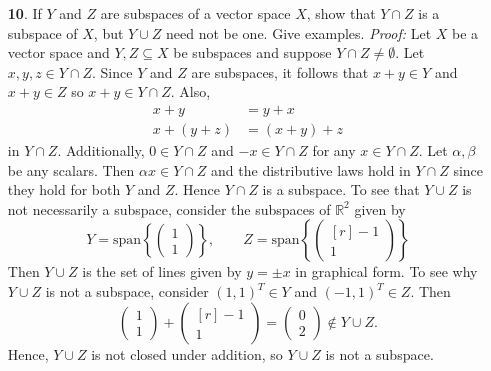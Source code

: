 \documentclass{article}
\begin{document}
\begin{itemize}
    \item[\textbf{10}.] If $Y$ and $Z$ are subspaces of a vector space $X$, show that $Y \cap Z$ is a subspace of $X$, but $Y \cup Z$ need not be one. Give examples.
    \newline\newline
    \textit{Proof:} Let $X$ be a vector space and $Y,Z \subseteq X$ be subspaces and suppose $Y\cap Z \neq \emptyset$. Let $x,y,z \in Y\cap Z$. Since $Y$ and $Z$ are subspaces, it follows that $x + y \in Y$ and $x + y \in Z$ so $x + y \in Y \cap Z$. Also,
    \begin{align*}
        x + y &= y + x\\
        x + (y + z) &= (x + y) + z
    \end{align*}
    in $Y \cap Z$. Additionally, $0 \in Y \cap Z$ and $-x \in Y \cap Z$ for any $x \in Y \cap Z$. Let $\alpha, \beta$ be any scalars. Then $\alpha x \in Y \cap Z$ and the distributive laws hold in $Y \cap Z$ since they hold for both $Y$ and $Z$. Hence $Y \cap Z$ is a subspace. To see that $Y\cup Z$ is not necessarily a subspace, consider the subspaces of $\mathbb{R}^2$ given by
    \[Y = \text{span}\left\{\begin{pmatrix}
        1\\
        1
    \end{pmatrix}\right\}, \hspace{2em} Z = \text{span}\left\{\begin{pmatrix*}[r]
        -1\\
        1
    \end{pmatrix*}\right\}\]
    Then $Y \cup Z$ is the set of lines given by $y = \pm x$ in graphical form. To see why $Y \cup Z$ is not a subspace, consider $(1,1)^T \in Y$ and $(-1, 1)^T \in Z$. Then
    \[\begin{pmatrix}
        1\\
        1
    \end{pmatrix} + \begin{pmatrix*}[r]
        -1\\
        1
    \end{pmatrix*} = \begin{pmatrix}
        0\\
        2
    \end{pmatrix} \notin Y \cup Z.\]
    Hence, $Y\cup Z$ is not closed under addition, so $Y \cup Z$ is not a subspace.
\end{itemize}
\end{document}
